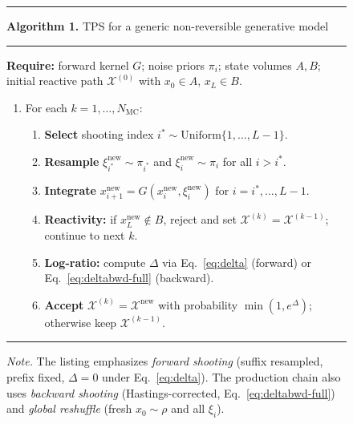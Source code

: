 \begin{figure}[t]
\hrule\vspace{2pt}
{\footnotesize\textbf{Algorithm 1.} TPS for a generic non-reversible generative model}
\vspace{1pt}\hrule\vspace{3pt}
{\footnotesize
\textbf{Require:} forward kernel $G$; noise priors $\pi_i$; state volumes $A,B$; initial reactive path $\mathcal{X}^{(0)}$ with $x_0\in A$, $x_L\in B$.
\begin{enumerate}\setlength{\itemsep}{0.15em}
  \item For each $k = 1,\ldots,N_{\mathrm{MC}}$:
  \begin{enumerate}\setlength{\itemsep}{0.1em}
    \item \textbf{Select} shooting index $i^* \sim \mathrm{Uniform}\{1,\ldots,L-1\}$.
    \item \textbf{Resample} $\xi_{i^*}^{\mathrm{new}} \sim \pi_{i^*}$ and $\xi_i^{\mathrm{new}}\sim\pi_i$ for all $i>i^*$.
    \item \textbf{Integrate} $x_{i+1}^{\mathrm{new}} = G(x_i^{\mathrm{new}}, \xi_i^{\mathrm{new}})$ for $i=i^*,\ldots,L-1$.
    \item \textbf{Reactivity:} if $x_L^{\mathrm{new}}\notin B$, reject and set $\mathcal{X}^{(k)}=\mathcal{X}^{(k-1)}$; continue to next $k$.
    \item \textbf{Log-ratio:} compute $\Delta$ via Eq.~\eqref{eq:delta} (forward) or Eq.~\eqref{eq:deltabwd-full} (backward).
    \item \textbf{Accept} $\mathcal{X}^{(k)}=\mathcal{X}^{\mathrm{new}}$ with probability $\min(1,e^{\Delta})$; otherwise keep $\mathcal{X}^{(k-1)}$.
  \end{enumerate}
\end{enumerate}}
\vspace{1pt}\hrule\vspace{2pt}
{\footnotesize\textit{Note.} The listing emphasizes \emph{forward shooting} (suffix resampled, prefix fixed, $\Delta = 0$ under Eq.~\eqref{eq:delta}). The production chain also uses \emph{backward shooting} (Hastings-corrected, Eq.~\eqref{eq:deltabwd-full}) and \emph{global reshuffle} (fresh $x_0 \sim \rho$ and all $\xi_i$).}
\vspace{1pt}
\label{alg:tps}
\end{figure}

